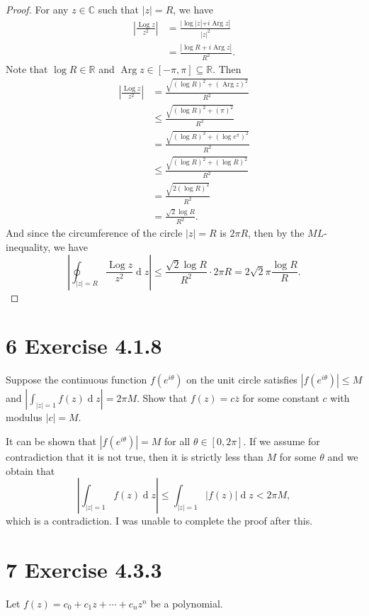 \documentclass[12pt]{article}
\newenvironment{problem}
    {\begin{lrbox}{\mybox}\begin{minipage}{0.98\textwidth}}
    {\end{minipage}\end{lrbox}\framebox[\textwidth]{\usebox{\mybox}}}
\newcommand{\R}{\mathbb{R}} %
\newcommand{\C}{\mathbb{C}} %
\newcommand{\<}{\left\langle} %
\renewcommand{\>}{\right\rangle} %
\newcommand{\Arg}{\operatorname{Arg}} %
\newcommand{\Log}{\operatorname{Log}} %
\renewcommand{\d}[1]{\operatorname{d}\!#1} %
\let\conj\overline %
\begin{document}
\begin{proof}
    For any $z\in\C$ such that $|z|=R$, we have
    \begin{align*}
        \left|\frac{\Log z}{z^2}\right|
            &= \frac{|\log|z| + i\Arg z|}{|z|^2} \\[1em]
            &= \frac{|\log R + i\Arg z|}{R^2}.
    \end{align*}
    Note that $\log R \in\R$ and $\Arg z \in[-\pi,\pi]\subseteq\R$. Then
    \begin{align*}
        \left|\frac{\Log z}{z^2}\right|
            &= \frac{\sqrt{(\log R)^2 + (\Arg z)^2}}{R^2} \\[1em]
            &\leq \frac{\sqrt{(\log R)^2 + (\pi)^2}}{R^2} \\[1em]
            &= \frac{\sqrt{(\log R)^2 + (\log e^\pi)^2}}{R^2} \\[1em]
            &\leq \frac{\sqrt{(\log R)^2 + (\log R)^2}}{R^2} \\[1em]
            &= \frac{\sqrt{2(\log R)^2}}{R^2} \\[1em]
            &= \frac{\sqrt{2}\log R}{R^2}.
    \end{align*}
    And since the circumference of the circle $|z|=R$ is $2\pi R$, then by the $ML$-inequality, we have
    \[\left|\oint_{|z|=R} \frac{\Log z}{z^2}\d{z}\right| \leq \frac{\sqrt{2}\log R}{R^2} \cdot 2\pi R = 2\sqrt{2}\pi\frac{\log R}{R}.\]
    
\end{proof}

\newpage
\section*{6 Exercise 4.1.8}
\begin{problem}
    Suppose the continuous function $f(e^{i\theta})$ on the unit circle satisfies $|f(e^{i\theta})| \leq M$ and $|\int_{|z|=1}f(z)\d{z}| = 2\pi M$. Show that $f(z)= c\conj{z}$ for some constant $c$ with modulus $|c| = M$.
\end{problem}
\medskip

It can be shown that $|f(e^{i\theta})| = M$ for all $\theta \in [0, 2\pi]$. If we assume for contradiction that it is not true, then it is strictly less than $M$ for some $\theta$ and we obtain that
\[\left|\int_{|z|=1}f(z)\d{z}\right| \leq \int_{|z|=1}|f(z)|\d{z} < 2\pi M,\]
which is a contradiction. I was unable to complete the proof after this.

\newpage
\section*{7 Exercise 4.3.3}
\begin{problem}
    Let $f(z)= c_0 + c_1 z + \cdots + c_n z^n$ be a polynomial.
\end{problem}
\end{document}
